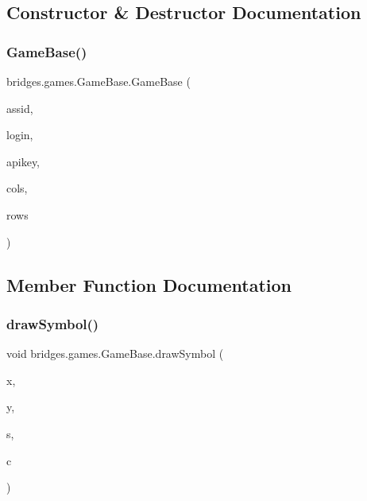 \subsection{Constructor \& Destructor Documentation}
\mbox{\label{classbridges_1_1games_1_1_game_base_a9ff11dcae7d4774a6341ff026212f96d}} 
\subsubsection{\texorpdfstring{Game\+Base()}{GameBase()}}
{\footnotesize\ttfamily bridges.\+games.\+Game\+Base.\+Game\+Base (\begin{DoxyParamCaption}\item[{int}]{assid,  }\item[{String}]{login,  }\item[{String}]{apikey,  }\item[{int}]{cols,  }\item[{int}]{rows }\end{DoxyParamCaption})}



\subsection{Member Function Documentation}
\mbox{\label{classbridges_1_1games_1_1_game_base_a7dd4caecd0522dcf7fc275517fbc695d}} 
\subsubsection{\texorpdfstring{draw\+Symbol()}{drawSymbol()}}
{\footnotesize\ttfamily void bridges.\+games.\+Game\+Base.\+draw\+Symbol (\begin{DoxyParamCaption}\item[{int}]{x,  }\item[{int}]{y,  }\item[{\hyperlink{enumbridges_1_1base_1_1_named_symbol}{Named\+Symbol}}]{s,  }\item[{\hyperlink{enumbridges_1_1base_1_1_named_color}{Named\+Color}}]{c }\end{DoxyParamCaption})\hspace{0.3cm}{\ttfamily [protected]}}



